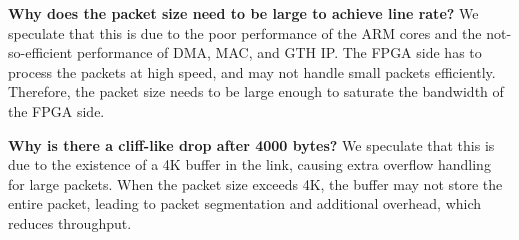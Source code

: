 \textbf{Why does the packet size need to be large to achieve line rate?} We speculate that this is due to the poor performance of the ARM cores and the not-so-efficient performance of DMA, MAC, and GTH IP. The FPGA side has to process the packets at high speed, and may not handle small packets efficiently. Therefore, the packet size needs to be large enough to saturate the bandwidth of the FPGA side.

\textbf{Why is there a cliff-like drop after 4000 bytes?} We speculate that this is due to the existence of a 4K buffer in the link, causing extra overflow handling for large packets. When the packet size exceeds 4K, the buffer may not store the entire packet, leading to packet segmentation and additional overhead, which reduces throughput.

